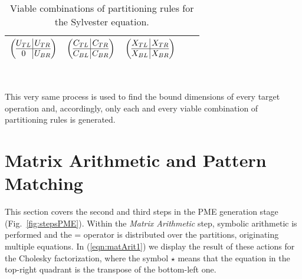 \documentclass{llncs}
\begin{document}
\begin{table}
\begin{tabular}{c | c | c | c | c}
$\left( \begin{array}{@{}c@{\,}|@{\,}c@{}} U_{TL} & U_{TR} \\\hline 0 & U_{BR} \end{array} \right)$ &
$\left( \begin{array}{@{}c@{\,}|@{\,}c@{}} C_{TL} & C_{TR} \\\hline C_{BL} & C_{BR} \end{array} \right)$ &
$\left( \begin{array}{@{}c@{\,}|@{\,}c@{}} X_{TL} & X_{TR} \\\hline X_{BL} & X_{BR} \end{array} \right)$ \\\bottomrule
\end{tabular}\\[1mm]
\caption{Viable combinations of partitioning rules for the Sylvester equation.} \label{tab:sylvPart}
\end{table}


This very same process is used to find the bound dimensions of every target
operation and, accordingly, only each and every viable combination
of partitioning rules is generated.

\section{Matrix Arithmetic and Pattern Matching} \label{sec:PattMatch}

This section covers the second and third steps in the PME generation stage (Fig.~\ref{fig:stepsPME}).
Within the {\it Matrix Arithmetic} step, symbolic arithmetic is performed and 
the = operator is distributed over the partitions, 
originating multiple equations.
In (\ref{eqn:matArit1}) we display the result of these actions for the Cholesky factorization,
where the symbol $\star$ means that the equation in the top-right quadrant
is the transpose of the bottom-left one.
\end{document}
